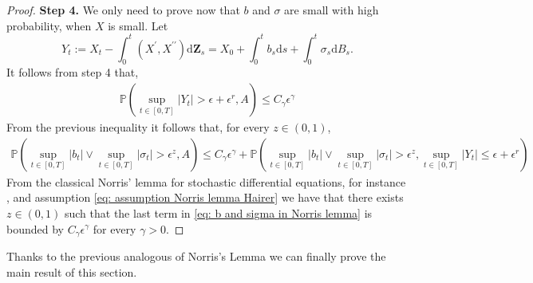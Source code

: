 \documentclass[11pt,a4paper]{article}
\newcommand{\rd}{\mathrm{d}}
\theoremstyle{plain}
\begin{document}
\begin{proof}
    \textbf{Step 4.} We only need to prove now that $b$ and $\sigma$ are small with high probability, when $X$ is small. Let
    \begin{equation*}
        Y_t := X_t - \int_{0}^{t}(X^{\prime},X^{\prime\prime}) \rd \mathbf{Z}_s = X_0 + \int_{0}^{t} b_s \rd s + \int_{0}^{t} \sigma_s \rd B_s.
    \end{equation*}
    It follows from step 4 that,
    \begin{align*}
        \mathbb{P}(\sup_{t\in[0,T]}|Y_t| > \epsilon + \epsilon^{r}, A) 
        \leq C_{\gamma} \epsilon^{\gamma}
    \end{align*}
    From the previous inequality it follows that, for every $z\in(0,1)$,
    \begin{align}
        \mathbb{P}(\sup_{t\in[0,T]}|b_t|\vee  \sup_{t\in[0,T]}|\sigma_t| > \epsilon^{z}, A) \leq 
        C_{\gamma} \epsilon^{\gamma}
        + \mathbb{P}(\sup_{t\in[0,T]}|b_t|\vee  \sup_{t\in[0,T]}|\sigma_t| > \epsilon^{z}, \sup_{t\in[0,T]}|Y_t| \leq \epsilon + \epsilon^{r})
        \label{eq: b and sigma in Norris lemma}
    \end{align}
   From the classical Norris' lemma for stochastic differential equations, for instance \cite[Lemma 4.11]{hairer2011malliavins}, and assumption \eqref{eq: assumption Norris lemma Hairer} we have that there exists $z\in (0,1)$ such that the last term in \eqref{eq: b and sigma in Norris lemma} is bounded by $C_{\gamma}\epsilon^{\gamma}$ for every $\gamma > 0$.
    


\end{proof}

Thanks to the previous analogous of Norris's Lemma we can finally prove the main result of this section.
\end{document}
